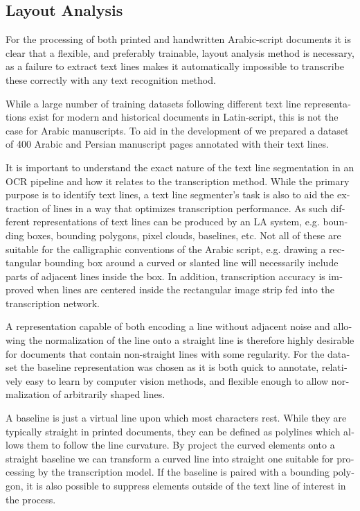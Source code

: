 \begin{french}
\section{Layout Analysis}

For the processing of both printed and handwritten Arabic-script documents it
is clear that a flexible, and preferably trainable, layout analysis method is
necessary, as a failure to extract text lines makes it automatically impossible
to transcribe these correctly with any text recognition method.

While a large number of training datasets following different text line
representations exist for modern and historical documents in Latin-script, this
is not the case for Arabic manuscripts. To aid in the development of we
prepared a dataset of 400 Arabic and Persian manuscript pages annotated with
their text lines.

It is important to understand the exact nature of the text line segmentation in
an OCR pipeline and how it relates to the transcription method. While the
primary purpose is to identify text lines, a text line segmenter's task is also
to aid the extraction of lines in a way that optimizes transcription
performance. As such different representations of text lines can be produced by
an LA system, e.g. bounding boxes, bounding polygons, pixel clouds, baselines,
etc. Not all of these are suitable for the calligraphic conventions of the
Arabic script, e.g. drawing a rectangular bounding box around a curved or
slanted line will necessarily include parts of adjacent lines inside the box.
In addition, transcription accuracy is improved when lines are centered inside
the rectangular image strip fed into the transcription network.

A representation capable of both encoding a line without adjacent noise and
allowing the normalization of the line onto a straight line is therefore highly
desirable for documents that contain non-straight lines with some regularity.
For the dataset the baseline representation was chosen as it is both quick to
annotate, relatively easy to learn by computer vision methods, and flexible
enough to allow normalization of arbitrarily shaped lines.

A baseline is just a virtual line upon which most characters rest. While they
are typically straight in printed documents, they can be defined as polylines
which allows them to follow the line curvature. By project the curved elements
onto a straight baseline we can transform a curved line into straight one
suitable for processing by the transcription model. If the baseline is paired
with a bounding polygon, it is also possible to suppress elements outside of
the text line of interest in the process.


\end{french}
